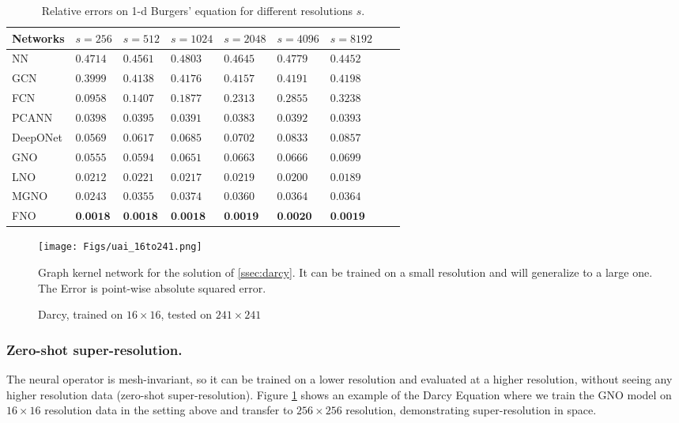 \begin{table}[ht]

\begin{center}
\begin{tabular}{l|llllllll}
\multicolumn{1}{c}{\bf Networks}
&\multicolumn{1}{c}{\bf $s=256$}
&\multicolumn{1}{c}{\bf $s=512$}
&\multicolumn{1}{c}{\bf $s=1024$}
&\multicolumn{1}{c}{\bf $s=2048$} 
&\multicolumn{1}{c}{\bf $s=4096$}
&\multicolumn{1}{c}{\bf $s=8192$}\\
\hline 
NN       &$0.4714$ &$0.4561$
&$0.4803$ &$0.4645$ &$0.4779$ &$0.4452$ \\
GCN           &$0.3999$ &$0.4138$
&$0.4176$   &$0.4157$  &$0.4191$ &$0.4198$\\
FCN         &$0.0958$ &$0.1407$
&$0.1877$   &$0.2313$  &$0.2855$ &$0.3238$\\
PCANN       &$0.0398$ &$0.0395$
&$0.0391$   &$0.0383$  &$0.0392$ &$0.0393$\\
DeepONet       &$0.0569$ &$0.0617$
&$0.0685$   &$0.0702$  &$0.0833$ &$0.0857$\\
\hline 
GNO     &$0.0555$ &$0.0594$ &$0.0651$   &$0.0663$  &$0.0666$ &$0.0699$\\
LNO      &$0.0212$ &$0.0221$
   &$0.0217$  &$0.0219$ &$0.0200$ &$0.0189$\\
MGNO      &$0.0243$ &$0.0355$
   &$0.0374$  &$0.0360$ &$0.0364$ &$0.0364$\\
FNO     &$\textbf{0.0018}$ &$\textbf{0.0018}$
   &$\textbf{0.0018}$  &$\textbf{0.0019}$ &$\textbf{0.0020}$ &$\textbf{0.0019}$\\
\hline 
\end{tabular}
\end{center}
\caption{ Relative errors on 1-d Burgers' equation for different resolutions $s$.} 
\label{table:burgers}
\end{table}





\begin{figure}[ht]
    \centering
    \texttt{[image: Figs/uai\_16to241.png]}
        \caption{Darcy, trained on $16 \times 16$, tested on $241 \times 241$}\label{fig:super1}
    \small{
    Graph kernel network for the solution of \eqref{ssec:darcy}. It can be trained on a small resolution and will generalize to a large one. The Error is point-wise absolute squared error.}
\end{figure}


\subsubsection{Zero-shot super-resolution.}
\label{sec:superresolution1}
The neural operator is mesh-invariant, so it can be trained on a lower resolution and evaluated at a higher resolution, without seeing any higher resolution data (zero-shot super-resolution).
Figure  \ref{fig:super1} shows an example of the Darcy Equation where we train the GNO model on $16 \times 16$ resolution data in the setting above and transfer to $256 \times 256$ resolution, demonstrating super-resolution in space.